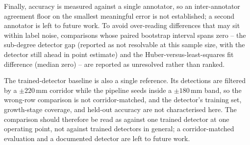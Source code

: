 Finally, accuracy is measured against a single annotator, so an inter-annotator
agreement floor on the smallest meaningful error is not established; a second
annotator is left to future work. To avoid over-reading differences that may sit
within label noise, comparisons whose paired bootstrap interval spans zero -- the sub-degree detector gap
(reported as not resolvable at this sample size, with the detector still ahead in point estimate) and the
Huber-versus-least-squares fit difference (median zero) -- are reported as unresolved rather than ranked.

The trained-detector baseline is also a single reference. Its detections are filtered by a $\pm220$\,mm
corridor while the pipeline seeds inside a $\pm180$\,mm band, so the wrong-row comparison is not
corridor-matched, and the detector's training set, growth-stage coverage, and held-out accuracy are not
characterised here. The comparison should therefore be read as against one trained detector at one operating
point, not against trained detectors in general; a corridor-matched evaluation and a documented detector are
left to future work.